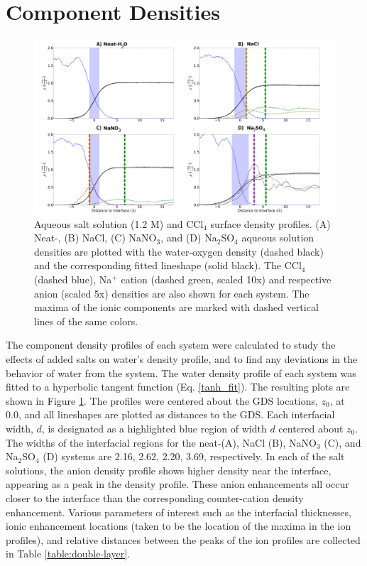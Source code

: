 \section{Component Densities}

\begin{figure}[h!]
\begin{center}
	\includegraphics[scale=1.0]{images/densities.png}
	\caption{Aqueous salt solution (1.2 M) and CCl$_4$ surface density profiles. (A) Neat-\ctcwat, (B) NaCl, (C) NaNO$_3$, and (D) Na$_2$SO$_4$ aqueous solution densities are plotted with the water-oxygen density (dashed black) and the corresponding fitted lineshape (solid black). The CCl$_4$ (dashed blue), Na$^+$ cation (dashed green, scaled 10x) and respective anion (scaled 5x) densities are also shown for each system. The maxima of the ionic components are marked with dashed vertical lines of the same colors.}
	\label{fig:density-plots}
\end{center}
\end{figure}

The component density profiles of each system were calculated to study the effects of added salts on water's density profile, and to find any deviations in the behavior of water from the \ctcwat system. The water density profile of each system was fitted to a hyperbolic tangent function (Eq. \ref{tanh_fit}). The resulting plots are shown in Figure \ref{fig:density-plots}. The profiles were centered about the GDS locations, $z_0$, at 0.0\angs, and all lineshapes are plotted as distances to the GDS. Each interfacial width, $d$, is designated as a highlighted blue region of width $d$ centered about $z_0$.  The widths of the interfacial regions for the neat-\ctcwat (A), NaCl (B), NaNO$_3$ (C), and Na$_2$SO$_4$ (D) systems are 2.16, 2.62, 2.20, 3.69\angs, respectively. In each of the salt solutions, the anion density profile shows higher density near the interface, appearing as a peak in the density profile. These anion enhancements all occur closer to the interface than the corresponding counter-cation density enhancement. Various parameters of interest such as the interfacial thicknesses, ionic enhancement locations (taken to be the location of the maxima in the ion profiles), and relative distances between the peaks of the ion profiles are collected in Table \ref{table:double-layer}.

